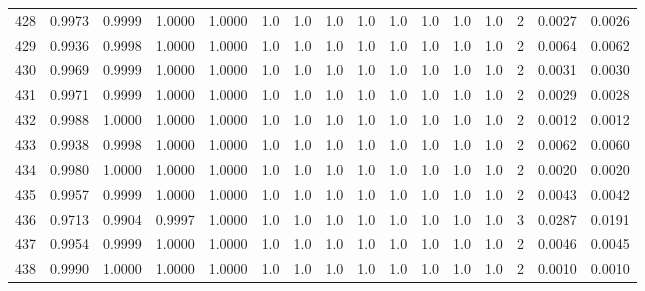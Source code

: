 \begin{tabular}{lrrrrrrrrrrrrrrr}
428 &      0.9973 &  0.9999 &  1.0000 &  1.0000 &     1.0 &     1.0 &     1.0 &     1.0 &     1.0 &     1.0 &      1.0 &        1.0 &      2 &                    0.0027 &                     0.0026 \\
429 &      0.9936 &  0.9998 &  1.0000 &  1.0000 &     1.0 &     1.0 &     1.0 &     1.0 &     1.0 &     1.0 &      1.0 &        1.0 &      2 &                    0.0064 &                     0.0062 \\
430 &      0.9969 &  0.9999 &  1.0000 &  1.0000 &     1.0 &     1.0 &     1.0 &     1.0 &     1.0 &     1.0 &      1.0 &        1.0 &      2 &                    0.0031 &                     0.0030 \\
431 &      0.9971 &  0.9999 &  1.0000 &  1.0000 &     1.0 &     1.0 &     1.0 &     1.0 &     1.0 &     1.0 &      1.0 &        1.0 &      2 &                    0.0029 &                     0.0028 \\
432 &      0.9988 &  1.0000 &  1.0000 &  1.0000 &     1.0 &     1.0 &     1.0 &     1.0 &     1.0 &     1.0 &      1.0 &        1.0 &      2 &                    0.0012 &                     0.0012 \\
433 &      0.9938 &  0.9998 &  1.0000 &  1.0000 &     1.0 &     1.0 &     1.0 &     1.0 &     1.0 &     1.0 &      1.0 &        1.0 &      2 &                    0.0062 &                     0.0060 \\
434 &      0.9980 &  1.0000 &  1.0000 &  1.0000 &     1.0 &     1.0 &     1.0 &     1.0 &     1.0 &     1.0 &      1.0 &        1.0 &      2 &                    0.0020 &                     0.0020 \\
435 &      0.9957 &  0.9999 &  1.0000 &  1.0000 &     1.0 &     1.0 &     1.0 &     1.0 &     1.0 &     1.0 &      1.0 &        1.0 &      2 &                    0.0043 &                     0.0042 \\
436 &      0.9713 &  0.9904 &  0.9997 &  1.0000 &     1.0 &     1.0 &     1.0 &     1.0 &     1.0 &     1.0 &      1.0 &        1.0 &      3 &                    0.0287 &                     0.0191 \\
437 &      0.9954 &  0.9999 &  1.0000 &  1.0000 &     1.0 &     1.0 &     1.0 &     1.0 &     1.0 &     1.0 &      1.0 &        1.0 &      2 &                    0.0046 &                     0.0045 \\
438 &      0.9990 &  1.0000 &  1.0000 &  1.0000 &     1.0 &     1.0 &     1.0 &     1.0 &     1.0 &     1.0 &      1.0 &        1.0 &      2 &                    0.0010 &                     0.0010 \\

\end{tabular}
